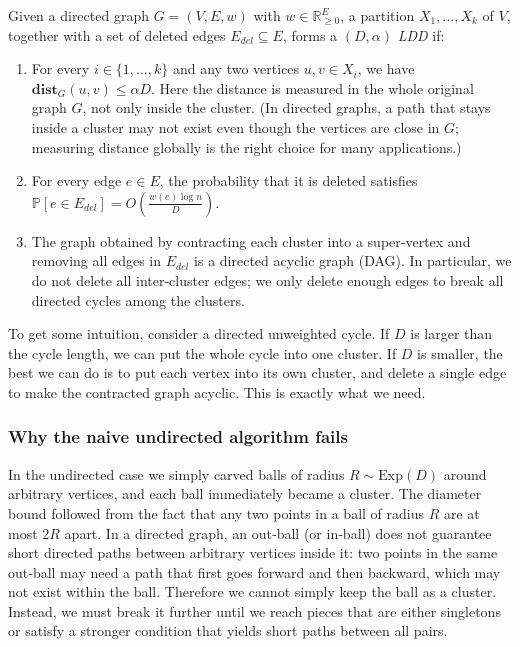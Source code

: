 \begin{definicija}
    Given a directed graph $G = (V, E, w)$ with $w \in \mathbb{R}_{\geq 0}^E$, a partition $X_1, \ldots, X_k$ of $V$, together with a set of deleted edges $E_{del} \subseteq E$, forms a $(D, \alpha)$ \textit{LDD} if:
    \begin{enumerate}
        \item For every $i \in \{1,\dots,k\}$ and any two vertices $u,v \in X_i$, we have $\mathbf{dist}_G(u,v) \leq \alpha D$. Here the distance is measured in the whole original graph $G$, not only inside the cluster. (In directed graphs, a path that stays inside a cluster may not exist even though the vertices are close in $G$; measuring distance globally is the right choice for many applications.)
        \item For every edge $e \in E$, the probability that it is deleted satisfies $\mathbb{P}[e \in E_{del}] = O\left(\frac{w(e) \log n}{D}\right)$.
        \item The graph obtained by contracting each cluster into a super‑vertex and removing all edges in $E_{del}$ is a directed acyclic graph (DAG). In particular, we do not delete all inter‑cluster edges; we only delete enough edges to break all directed cycles among the clusters.
    \end{enumerate}
\end{definicija}

To get some intuition, consider a directed unweighted cycle. If $D$ is larger than the cycle length, we can put the whole cycle into one cluster. If $D$ is smaller, the best we can do is to put each vertex into its own cluster, and delete a single edge to make the contracted graph acyclic. This is exactly what we need.

\subsubsection{Why the naive undirected algorithm fails}
In the undirected case we simply carved balls of radius $R\sim \text{Exp}(D)$ around arbitrary vertices, and each ball immediately became a cluster. The diameter bound followed from the fact that any two points in a ball of radius $R$ are at most $2R$ apart. In a directed graph, an out‑ball (or in‑ball) does not guarantee short directed paths between arbitrary vertices inside it: two points in the same out‑ball may need a path that first goes forward and then backward, which may not exist within the ball. Therefore we cannot simply keep the ball as a cluster. Instead, we must break it further until we reach pieces that are either singletons or satisfy a stronger condition that yields short paths between all pairs.

